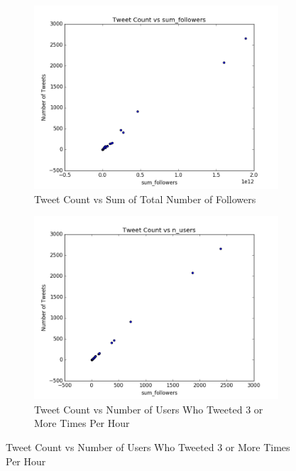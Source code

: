 \documentclass[12pt]{article}
\begin{document}
\begin{figure}[H]
\centering
\begin{subfigure}{.45\textwidth}
  \centering
\includegraphics[width=\textwidth]{figures/count_vs_sum_tweets_sb49.png}
\caption{Tweet Count vs Sum of Total Number of Followers}
\label{part1:fig:LC}
\end{subfigure}%
\hfill
\begin{subfigure}{.45\textwidth}
  \centering
\includegraphics[width=\textwidth]{figures/count_vs_n_users_tweets_sb49.png}
\caption{Tweet Count vs Number of Users Who Tweeted 3 or More Times Per Hour}
\label{part1:fig:LC}
\end{subfigure}


\end{figure}
\end{document}

